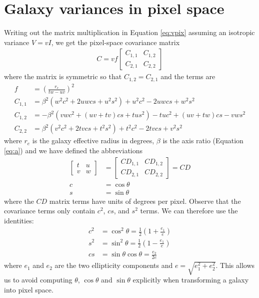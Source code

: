 \documentclass[11pt,letterpaper]{aastex63}
\newcommand{\eqnref}[1]{Equation \ref{#1}}
\newcommand{\CD}{C\!D}
\begin{document}
\clearpage
\appendix

\section{Galaxy variances in pixel space}
\label{app:transform}

Writing out the matrix multiplication in \eqnref{eq:vpix} assuming an
isotropic variance $V = v I$, we get the pixel-space covariance matrix
\begin{align}
C = v f \begin{bmatrix}
C_{1,1} & C_{1,2} \\
C_{2,1} & C_{2,2}
\end{bmatrix}
\end{align}
where the matrix is symmetric so that $C_{1,2} = C_{2,1}$ and the terms are
\begin{align}
f & = \left( \frac{r_e}{t w - u v} \right)^2
\\
C_{1,1} & =
%
\beta^2(w^2 c^2 + 2 u w c s + u^2 s^2) + u^2 c^2 - 2 u w c s + w^2 s^2
\\
C_{1,2} & =
%
-\beta^2 (v w c^2 + (u v + t v) c s + t u s^2) - t u c^2 + (u v + t w) c s - v w s^2
\\
C_{2,2} & =
%
\beta^2 (v^2 c^2 + 2 t v c s + t^2 s^2) + t^2 c^2 - 2 t v c s + v^2 s^2
\end{align}
where $r_e$ is the galaxy effective radius in degrees,
$\beta$ is the axis ratio (\eqnref{eq:a}) and
we have defined the abbreviations
\begin{align}
\begin{bmatrix}
t & u \\
v & w
\end{bmatrix}
& = 
\begin{bmatrix}
\CD_{1,1} & \CD_{1,2} \\
\CD_{2,1} & \CD_{2,2}
\end{bmatrix}
=
\CD
\\
c &= \cos \theta \\
s &= \sin \theta
\end{align}
where the $\CD$ matrix terms have units of degrees per pixel.
Observe that the covariance terms only contain $c^2$, $cs$, and $s^2$
terms.  We can therefore use the identities:
\begin{align}
c^2 & = \cos^2 \theta            =
\tfrac{1}{2} \left(1 + \frac{e_1}{e} \right) \\
s^2 & = \sin^2 \theta            =
\tfrac{1}{2} \left(1 - \frac{e_1}{e} \right) \\
cs  & = \sin \theta \cos \theta  = %
\frac{e_2}{2 e}
\end{align}
where $e_1$ and $e_2$ are the two ellipticity components and $e =
\sqrt{e_1^2 + e_2^2}$.  This allows us to avoid computing $\theta$,
$\cos \theta$ and $\sin \theta$ explicitly when transforming a galaxy
into pixel space.
\end{document}
